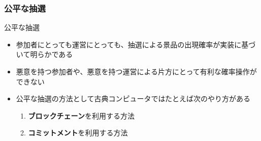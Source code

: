 \begin{frame}
  \frametitle{公平な抽選}

  \pause
  \begin{block}{公平な抽選}
    \begin{itemize}
      \item 参加者にとっても運営にとっても、抽選による景品の出現確率が実装に基づいて明らかである
      \item 悪意を持つ参加者や、悪意を持つ運営による片方にとって有利な確率操作ができない
    \end{itemize}
  \end{block}

  \pause
  \begin{itemize}
    \item 公平な抽選の方法として古典コンピュータではたとえば次のやり方がある
    \begin{enumerate}
      \item \textbf{ブロックチェーン}を利用する方法
      \item \textbf{コミットメント}を利用する方法
    \end{enumerate}
  \end{itemize}
\end{frame}

